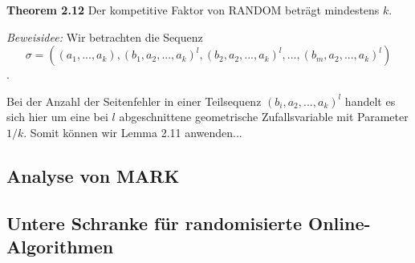 \textbf{Theorem 2.12} Der kompetitive Faktor von RANDOM beträgt mindestens $k$.

\textit{Beweisidee:} Wir betrachten die Sequenz $$\sigma = \left((a_1,...,a_k),(b_1,a_2,...,a_k)^l,(b_2,a_2,...,a_k)^l,...,(b_m,a_2,...,a_k)^l\right)$$.

Bei der Anzahl der Seitenfehler in einer Teilsequenz $(b_i,a_2,...,a_k)^l$ handelt es sich hier um eine bei $l$ abgeschnittene geometrische Zufallsvariable mit Parameter $1/k$. Somit können wir Lemma 2.11 anwenden...


\subsection{Analyse von MARK}

\subsection{Untere Schranke für randomisierte Online-Algorithmen}
